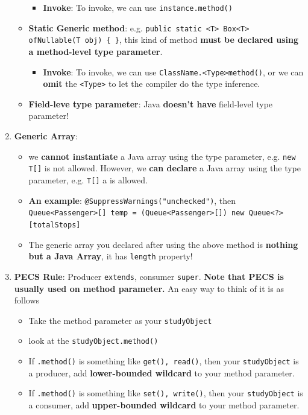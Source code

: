 \documentclass[10pt, landscape]{article}
\begin{document}
\begin{multicols}{4}
\begin{enumerate}
\begin{itemize}
        \begin{itemize}
            \item \textbf{Invoke}: To invoke, we can use \texttt{instance.method()}
        \end{itemize}
        \item \textbf{Static Generic method}: e.g. \texttt{public static <T> Box<T> ofNullable(T obj) \{ \}}, this kind of method \textbf{must be declared using a method-level type parameter}.
        \begin{itemize}
            \item \textbf{Invoke}: To invoke, we can use \texttt{ClassName.<Type>method()}, or we can \textbf{omit} the \texttt{<Type>} to let the compiler do the type inference.
        \end{itemize}
        \item \textbf{Field-leve type parameter}: Java \textbf{doesn't have} field-level type parameter!
    \end{itemize}
    \item \textbf{Generic Array}:
    \begin{itemize}
        \item we \textbf{cannot instantiate} a Java array using the type parameter, e.g. \texttt{new T[]} is not allowed. However, we \textbf{can declare} a Java array using the type parameter, e.g. \texttt{T[]} a is allowed.
        \item \textbf{An example}: \texttt{@SuppressWarnings("unchecked")}, then \texttt{Queue<Passenger>[] temp = (Queue<Passenger>[]) new Queue<?>[totalStops]}
        \item The generic array you declared after using the above method is \textbf{nothing but a Java Array}, it has \texttt{length} property!
    \end{itemize}
    \item \textbf{PECS Rule}: Producer \texttt{extends}, consumer \texttt{super}. \textbf{Note that PECS is usually used on method parameter.} An easy way to think of it is as follows
    \begin{itemize}
        \item Take the method parameter as your \texttt{studyObject}
        \item look at the \texttt{studyObject.method()}
        \item If \texttt{.method()} is something like \texttt{get(), read()}, then your \texttt{studyObject} is a producer, add \textbf{lower-bounded wildcard} to your method parameter.
        \item If \texttt{.method()} is something like \texttt{set(), write()}, then your \texttt{studyObject} is a consumer, add \textbf{upper-bounded wildcard} to your method parameter.

\end{itemize}
\end{enumerate}
\end{multicols}
\end{document}

